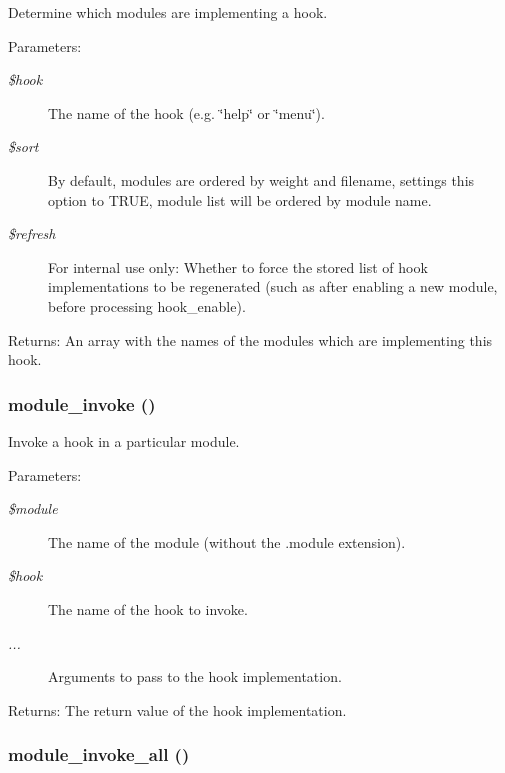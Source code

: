 Determine which modules are implementing a hook.

\begin{Desc}
\item[Parameters:]
\begin{description}
\item[{\em \$hook}]The name of the hook (e.g. \char`\"{}help\char`\"{} or \char`\"{}menu\char`\"{}). \item[{\em \$sort}]By default, modules are ordered by weight and filename, settings this option to TRUE, module list will be ordered by module name. \item[{\em \$refresh}]For internal use only: Whether to force the stored list of hook implementations to be regenerated (such as after enabling a new module, before processing hook\_\-enable). \end{description}
\end{Desc}
\begin{Desc}
\item[Returns:]An array with the names of the modules which are implementing this hook. \end{Desc}
\hypertarget{group__hooks_gbd6f189b7bcc74d05755d41ec1dfdfc3}{
\subsubsection[{module\_\-invoke}]{\setlength{\rightskip}{0pt plus 5cm}module\_\-invoke ()}}
\label{group__hooks_gbd6f189b7bcc74d05755d41ec1dfdfc3}


Invoke a hook in a particular module.

\begin{Desc}
\item[Parameters:]
\begin{description}
\item[{\em \$module}]The name of the module (without the .module extension). \item[{\em \$hook}]The name of the hook to invoke. \item[{\em ...}]Arguments to pass to the hook implementation. \end{description}
\end{Desc}
\begin{Desc}
\item[Returns:]The return value of the hook implementation. \end{Desc}
\hypertarget{group__hooks_g85e2028954b5e23c5ba2c5f1bd4e3e14}{
\subsubsection[{module\_\-invoke\_\-all}]{\setlength{\rightskip}{0pt plus 5cm}module\_\-invoke\_\-all ()}}
\label{group__hooks_g85e2028954b5e23c5ba2c5f1bd4e3e14}


